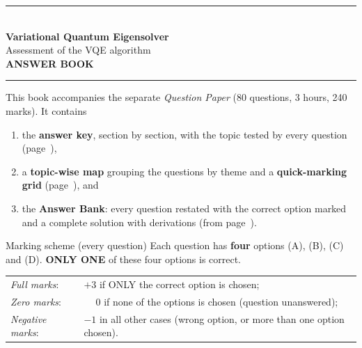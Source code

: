 \documentclass[11pt,a4paper]{article}
\begin{document}
\pagestyle{fancy}\fancyhf{}
\renewcommand{\headrulewidth}{0.4pt}

\thispagestyle{empty}
\begin{center}
{\color{brand}\rule{\linewidth}{1.2pt}}\\[6pt]
{\Huge\bfseries\color{brand} Variational Quantum Eigensolver}\\[4pt]
{\Large Assessment of the VQE algorithm}\\[4pt]
{\large\bfseries ANSWER BOOK}\\[2pt]
{\color{brand}\rule{\linewidth}{1.2pt}}
\end{center}
This book accompanies the separate \emph{Question Paper} (80 questions, 3 hours, 240 marks). It contains
\begin{enumerate}[leftmargin=1.4em, itemsep=0pt, topsep=2pt]
\item the \textbf{answer key}, section by section, with the topic tested by every question (page~\pageref{key}),
\item a \textbf{topic-wise map} grouping the questions by theme and a \textbf{quick-marking grid} (page~\pageref{topicmap}), and
\item the \textbf{Answer Bank}: every question restated with the correct option marked \textcolor{okgreen}{} and a
      complete solution with derivations (from page~\pageref{bank}).
\end{enumerate}
\begin{infobox}{Marking scheme (every question)}
Each question has \textbf{four} options (A), (B), (C) and (D). \textbf{ONLY ONE} of these four options is correct.\\[2pt]
\begin{tabular}{@{}ll@{}}
\emph{Full marks}: & $+3$ if ONLY the correct option is chosen;\\
\emph{Zero marks}: & $\phantom{+}0$ if none of the options is chosen (question unanswered);\\
\emph{Negative marks}: & $-1$ in all other cases (wrong option, or more than one option chosen).
\end{tabular}
\end{infobox}
\end{document}
